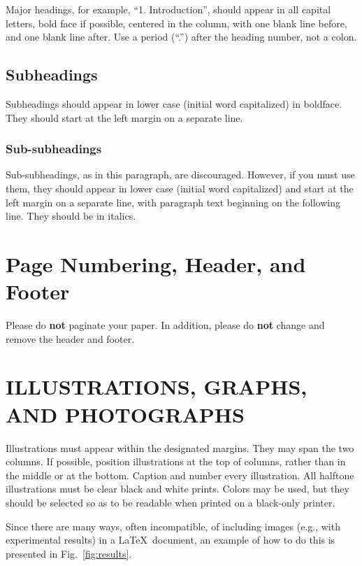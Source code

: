\documentclass{article}
\begin{document}
\begin{sloppy}
Major headings, for example, ``1. Introduction'', should 
appear in all capital letters, bold face if possible, 
centered in the column, with one blank line before, 
and one blank line after. Use a period (``.'') after 
the heading number, not a colon.

\subsection{Subheadings}
\label{ssec:subhead}

Subheadings should appear in lower case (initial word 
capitalized) in boldface. They should start at the left 
margin on a separate line. 
 
\subsubsection{Sub-subheadings}
\label{sssec:subsubhead}

Sub-subheadings, as in this paragraph, are discouraged. 
However, if you must use them, they should appear in 
lower case (initial word capitalized) and start at the 
left margin on a separate line, with paragraph
text beginning on the following line. They should be 
in italics. 
 

\section{Page Numbering, Header, and Footer}
\label{sec:page}

Please do {\bf not} paginate your paper. 
In addition, please do {\bf not} change and remove
the header and footer.

\section{ILLUSTRATIONS, GRAPHS, AND PHOTOGRAPHS}
\label{sec:illust}

Illustrations must appear within the designated margins.  
They may span the two columns. If possible, position 
illustrations at the top of columns, rather than in 
the middle or at the bottom. Caption and number every 
illustration. All halftone illustrations must be clear 
black and white prints. Colors may be used, but they 
should be selected so as to be readable when printed 
on a black-only printer.

Since there are many ways, often incompatible, of 
including images (e.g., with experimental results) 
in a \LaTeX\ document, an example of how to do
this is presented in Fig.~\ref{fig:results}.


\end{sloppy}
\end{document}
